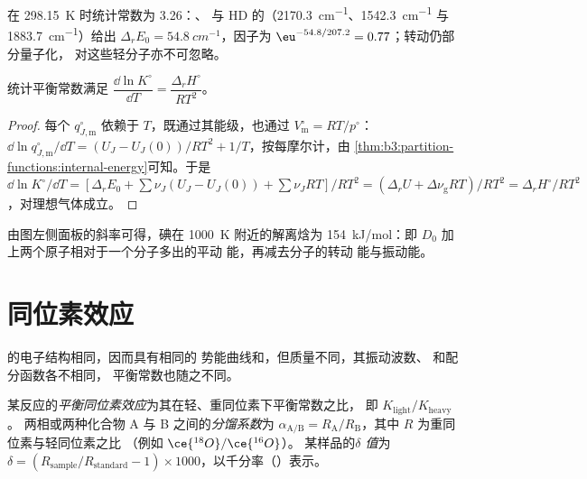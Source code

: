 在 \qty{298.15}{K} 时统计常数为 3.26：、
 与 HD 的（\qty{2170.3}{cm^{-1}}、\qty{1542.3}{cm^{-1}} 与 \qty{1883.7}{cm^{-1}}）给出 $\Delta_rE_0 =
\qty{54.8}{cm^{-1}}$，因子为 $\eu^{-54.8/207.2} = 0.77$；转动仍部分量子化，
对这些轻分子亦不可忽略。

\begin{proposition}[范托夫方程的再推导]\label{prop:b3:statistical-thermo-applied:vant-hoff-stat}
统计平衡常数满足 $\dfrac{\dd\ln K^\circ}{\dd T} = \dfrac{\Delta_rH^\circ}{RT^2}$。
\end{proposition}

\begin{proof}
每个 $q^\circ_{J,\mathrm m}$ 依赖于 $T$，既通过其能级，也通过 $V^\circ_{\mathrm m} = RT/p^\circ$：
$\dd\ln q^\circ_{J,\mathrm m}/\dd T = (U_J - U_J(0))/RT^2 + 1/T$，按每摩尔计，由
\cref{thm:b3:partition-functions:internal-energy}可知。于是 $\dd\ln K^\circ/\dd T =
[\Delta_rE_0 + \sum\nu_J(U_J - U_J(0)) + \sum\nu_JRT]/RT^2 = (\Delta_rU + \Delta\nu_{\mathrm g}RT)/RT^2 =
\Delta_rH^\circ/RT^2$，对理想气体成立。
\end{proof}

由图左侧面板的斜率可得，碘在 \qty{1000}{K} 附近的解离焓为
\qty{154}{kJ/mol}：即 $D_0$ 加上两个原子相对于一个分子多出的平动
能，再减去分子的转动
能与振动能。

\section{同位素效应}

的电子结构相同，因而具有相同的
势能曲线和，但质量不同，其振动波数、
和配分函数各不相同，
平衡常数也随之不同。

\begin{definition}\label{def:b3:statistical-thermo-applied:isotope-effect}
某反应的\emph{平衡同位素效应}为其在轻、重同位素下平衡常数之比，
即 $K_{\mathrm{light}}/K_{\mathrm{heavy}}$。
两相或两种化合物 A 与 B 之间的\emph{分馏系数}为
$\alpha_{\mathrm{A/B}} = R_{\mathrm A}/R_{\mathrm B}$，其中 $R$ 为重同位素与轻同位素之比
（例如 $\ce{^{18}O}/\ce{^{16}O}$）。
某样品的\emph{$\delta$ 值}为 $\delta = (R_{\mathrm{sample}}/R_{\mathrm{standard}}
- 1) \times 1000$，以千分率（\textperthousand）表示。
\end{definition}

